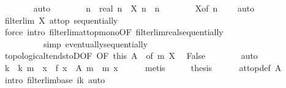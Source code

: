\begin{isabellebody}
\ \ \ \ \ \ \isamarkupfalse%
\ auto\isanewline
\ \ \ \ \isamarkupfalse%
\ {\isachardoublequoteopen}{}\ {\isasymle}\ n\ {\isasymLongrightarrow}\ real\ n\ {\isasymle}\ X\ n{\isachardoublequoteclose}\ \ n\isanewline
\ \ \ \ \ \ \isamarkupfalse%
\ X{\isacharbrackleft}{\kern0pt}of\ {\isachardoublequoteopen}n\ {\isacharminus}{\kern0pt}\ {}{\isachardoublequoteclose}{\isacharbrackright}{\kern0pt}\ \isamarkupfalse%
\ auto\isanewline
\ \ \ \ \isamarkupfalse%
\ \isamarkupfalse%
\ {\isachardoublequoteopen}filterlim\ X\ at{\isacharunderscore}{\kern0pt}top\ sequentially{\isachardoublequoteclose}\isanewline
\ \ \ \ \ \ \isamarkupfalse%
\ {\isacharparenleft}{\kern0pt}force\ intro{\isacharbang}{\kern0pt}{\isacharcolon}{\kern0pt}\ filterlim{\isacharunderscore}{\kern0pt}at{\isacharunderscore}{\kern0pt}top{\isacharunderscore}{\kern0pt}mono{\isacharbrackleft}{\kern0pt}OF\ filterlim{\isacharunderscore}{\kern0pt}real{\isacharunderscore}{\kern0pt}sequentially{\isacharbrackright}{\kern0pt}\isanewline
\ \ \ \ \ \ \ \ \ \ simp{\isacharcolon}{\kern0pt}\ eventually{\isacharunderscore}{\kern0pt}sequentially{\isacharparenright}{\kern0pt}\isanewline
\ \ \ \ \isamarkupfalse%
\ topological{\isacharunderscore}{\kern0pt}tendstoD{\isacharbrackleft}{\kern0pt}OF\ {\isacharasterisk}{\kern0pt}{\isacharbrackleft}{\kern0pt}OF\ this{\isacharbrackright}{\kern0pt}\ A{\isacharparenleft}{\kern0pt}{}{\isacharcomma}{\kern0pt}\ {}{\isacharparenright}{\kern0pt}{\isacharcomma}{\kern0pt}\ of\ m{\isacharbrackright}{\kern0pt}\ X{\isacharparenleft}{\kern0pt}{}{\isacharparenright}{\kern0pt}\ \isamarkupfalse%
\ False\isanewline
\ \ \ \ \ \ \isamarkupfalse%
\ auto\isanewline
\ \ \isamarkupfalse%
\isanewline
\ \ \isamarkupfalse%
\ \isamarkupfalse%
\ k\ \ {\isachardoublequoteopen}k\ m\ {\isasymle}\ x\ {\isasymLongrightarrow}\ f\ x\ {\isasymin}\ A\ m{\isachardoublequoteclose}\ \ m\ x\isanewline
\ \ \ \ \isamarkupfalse%
\ metis\isanewline
\ \ \isamarkupfalse%
\ \isamarkupfalse%
\ {\isacharquery}{\kern0pt}thesis\isanewline
\ \ \ \ \isamarkupfalse%
\ at{\isacharunderscore}{\kern0pt}top{\isacharunderscore}{\kern0pt}def\ A\ \isamarkupfalse%
\ {\isacharparenleft}{\kern0pt}intro\ filterlim{\isacharunderscore}{\kern0pt}base{\isacharbrackleft}{\kern0pt}\ i{\isacharequal}{\kern0pt}k{\isacharbrackright}{\kern0pt}{\isacharparenright}{\kern0pt}\ auto\isanewline

\end{isabellebody}
